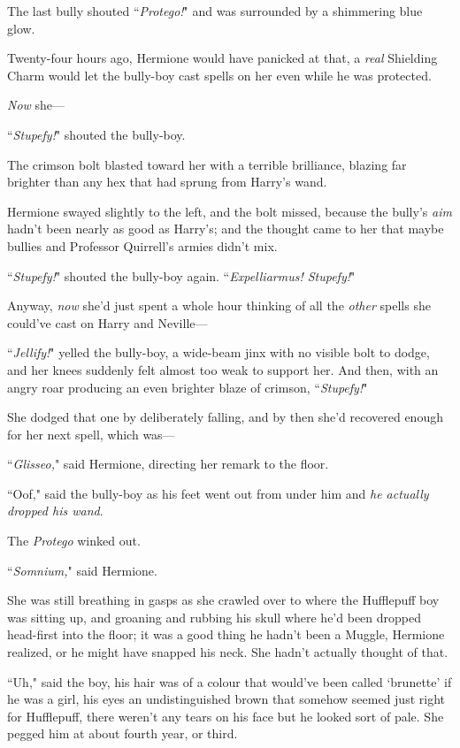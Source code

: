 The last bully shouted ``\emph{Protego!}" and was surrounded by a shimmering blue glow.

Twenty-four hours ago, Hermione would have panicked at that, a \emph{real} Shielding Charm would let the bully-boy cast spells on her even while he was protected.

\emph{Now} she—

``\emph{Stupefy!}" shouted the bully-boy.

The crimson bolt blasted toward her with a terrible brilliance, blazing far brighter than any hex that had sprung from Harry's wand.

Hermione swayed slightly to the left, and the bolt missed, because the bully's \emph{aim} hadn't been nearly as good as Harry's; and the thought came to her that maybe bullies and Professor Quirrell's armies didn't mix.

``\emph{Stupefy!}" shouted the bully-boy again. ``\emph{Expelliarmus! Stupefy!}"

Anyway, \emph{now} she'd just spent a whole hour thinking of all the \emph{other} spells she could've cast on Harry and Neville—

``\emph{Jellify!}" yelled the bully-boy, a wide-beam jinx with no visible bolt to dodge, and her knees suddenly felt almost too weak to support her. And then, with an angry roar producing an even brighter blaze of crimson, ``\emph{Stupefy!}"

She dodged that one by deliberately falling, and by then she'd recovered enough for her next spell, which was—

``\emph{Glisseo,}" said Hermione, directing her remark to the floor.

``Oof," said the bully-boy as his feet went out from under him and \emph{he actually dropped his wand}.

The \emph{Protego} winked out.

``\emph{Somnium,}" said Hermione.

She was still breathing in gasps as she crawled over to where the Hufflepuff boy was sitting up, and groaning and rubbing his skull where he'd been dropped head-first into the floor; it was a good thing he hadn't been a Muggle, Hermione realized, or he might have snapped his neck. She hadn't actually thought of that.

``Uh," said the boy, his hair was of a colour that would've been called `brunette' if he was a girl, his eyes an undistinguished brown that somehow seemed just right for Hufflepuff, there weren't any tears on his face but he looked sort of pale. She pegged him at about fourth year, or third.

